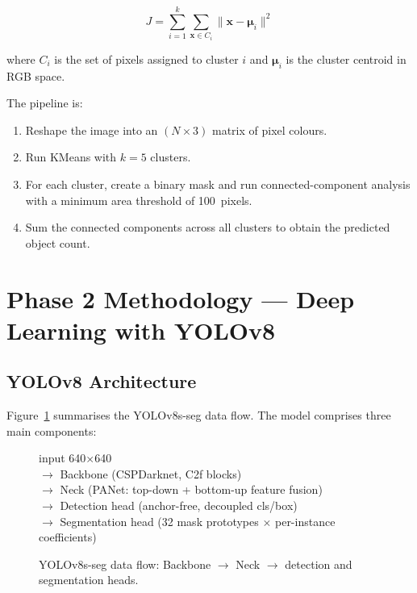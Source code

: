\documentclass[12pt, a4paper]{article}
\begin{document}
\begin{equation}
J = \sum_{i=1}^{k} \sum_{\mathbf{x} \in C_i} \|\mathbf{x} - \boldsymbol{\mu}_i\|^2
\label{eq:kmeans}
\end{equation}

\noindent where $C_i$ is the set of pixels assigned to cluster $i$ and
$\boldsymbol{\mu}_i$ is the cluster centroid in RGB space.

The pipeline is:
\begin{enumerate}
    \item Reshape the image into an $(N \times 3)$ matrix of pixel colours.
    \item Run KMeans with $k = 5$ clusters.
    \item For each cluster, create a binary mask and run connected-component
          analysis with a minimum area threshold of 100~pixels.
    \item Sum the connected components across all clusters to obtain the
          predicted object count.
\end{enumerate}

\section{Phase 2 Methodology — Deep Learning with YOLOv8}

\subsection{YOLOv8 Architecture}

Figure~\ref{fig:arch} summarises the YOLOv8s-seg data flow.  The model
comprises three main components:

\begin{figure}[H]
\centering
\begin{minipage}{0.85\textwidth}
\ttfamily\small
input 640$\times$640 \\
\quad$\rightarrow$ Backbone (CSPDarknet, C2f blocks) \\
\quad$\rightarrow$ Neck (PANet: top-down + bottom-up feature fusion) \\
\quad$\rightarrow$ Detection head (anchor-free, decoupled cls/box) \\
\quad$\rightarrow$ Segmentation head (32 mask prototypes $\times$ per-instance
coefficients)
\end{minipage}
\caption{YOLOv8s-seg data flow: Backbone $\rightarrow$ Neck $\rightarrow$
detection and segmentation heads.}
\label{fig:arch}
\end{figure}
\end{document}
